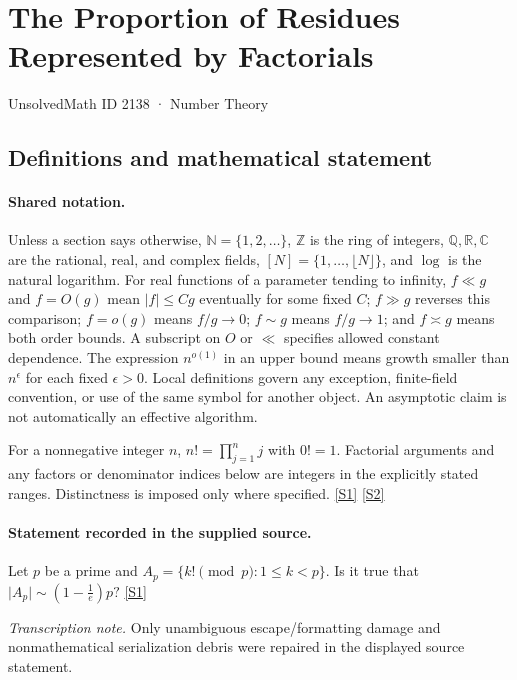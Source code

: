 \documentclass[11pt,a4paper]{article}
\newcommand{\N}{\mathbb{N}}
\newcommand{\Z}{\mathbb{Z}}
\newcommand{\Q}{\mathbb{Q}}
\newcommand{\R}{\mathbb{R}}
\newcommand{\C}{\mathbb{C}}
\newcommand{\sref}[2]{\hyperlink{source:#1:#2}{[S#2]}}
\begin{document}

\setcounter{section}{2137}

\section{The Proportion of Residues Represented by Factorials}\label{2138}

{\small\sffamily UnsolvedMath ID 2138 · Number Theory}

\subsection{Definitions and mathematical statement}

\paragraph{Shared notation.}Unless a section says otherwise, $\N=\{1,2,\ldots\}$,
$\Z$ is the ring of integers, $\Q,\R,\C$ are the rational, real, and complex
fields, $[N]=\{1,\ldots,\lfloor N\rfloor\}$, and $\log$ is the natural
logarithm. For real functions of a parameter tending to infinity,
$f\ll g$ and $f=O(g)$ mean $|f|\leq Cg$ eventually for some fixed $C$;
$f\gg g$ reverses this comparison; $f=o(g)$ means $f/g\to0$;
$f\sim g$ means $f/g\to1$; and $f\asymp g$ means both order bounds.
A subscript on $O$ or $\ll$ specifies allowed constant dependence.
The expression $n^{o(1)}$ in an upper bound means growth smaller than
$n^\epsilon$ for each fixed $\epsilon>0$. Local definitions govern any
exception, finite-field convention, or use of the same symbol for another
object. An asymptotic claim is not automatically an effective algorithm.



For a nonnegative integer $n$, $n!=\prod_{j=1}^n j$ with $0!=1$. Factorial arguments and any factors or denominator indices below are integers in the explicitly stated ranges. Distinctness is imposed only where specified. \sref{2138}{1} \sref{2138}{2}

\paragraph{Statement recorded in the supplied source.}
Let $p$ be a prime and $ A_p = \{ k! \pmod{p} : 1\leq k<p\}. $ Is it true that $ \lvert A_p\rvert \sim (1-\tfrac{1}{e})p? $ \sref{2138}{1}

{\small\emph{Transcription note.} Only unambiguous escape/formatting damage and nonmathematical serialization debris were repaired in the displayed source statement.}
\end{document}
